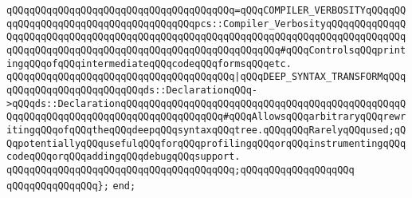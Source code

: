 \verb|qQQqqQQqqQQqqQQqqQQqqQQqqQQqqQQqqQQqqQQq=qQQqCOMPILER_VERBOSITYqQQqqQQqqQQqqQQqqQQqqQQqqQQqqQQqqQQqqQQqpcs::Compiler_VerbosityqQQqqQQqqQQqqQQqqQQqqQQqqQQqqQQqqQQqqQQqqQQqqQQqqQQqqQQqqQQqqQQqqQQqqQQqqQQqqQQqqQQqqQQqqQQqqQQqqQQqqQQqqQQqqQQqqQQqqQQqqQQqqQQqqQQq#qQQqControlsqQQqprintingqQQqofqQQqintermediateqQQqcodeqQQqformsqQQqetc.|\newline
\verb|qQQqqQQqqQQqqQQqqQQqqQQqqQQqqQQqqQQqqQQq|\verb#|qQQqDEEP_SYNTAX_TRANSFORMqQQqqQQqqQQqqQQqqQQqqQQqqQQqds::DeclarationqQQq->qQQqds::DeclarationqQQqqQQqqQQqqQQqqQQqqQQqqQQqqQQqqQQqqQQqqQQqqQQqqQQqqQQqqQQqqQQqqQQqqQQqqQQqqQQqqQQqqQQq#\verb|#qQQqAllowsqQQqarbitraryqQQqrewritingqQQqofqQQqtheqQQqdeepqQQqsyntaxqQQqtree.qQQqqQQqRarelyqQQqused;qQQqpotentiallyqQQqusefulqQQqforqQQqprofilingqQQqorqQQqinstrumentingqQQqcodeqQQqorqQQqaddingqQQqdebugqQQqsupport.|\newline
\verb|qQQqqQQqqQQqqQQqqQQqqQQqqQQqqQQqqQQqqQQq;qQQqqQQqqQQqqQQqqQQq|\newline
\verb|qQQqqQQqqQQqqQQq};|\newline
\verb|end;|\newline
\newline
\newline
\newline

